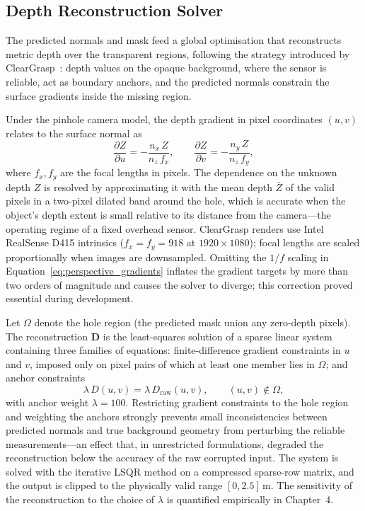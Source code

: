 \subsection{Depth Reconstruction Solver}
\label{subsec:solver}

The predicted normals and mask feed a global optimisation that reconstructs metric depth over the transparent regions, following the strategy introduced by ClearGrasp~\citep{sajjan2020}: depth values on the opaque background, where the sensor is reliable, act as boundary anchors, and the predicted normals constrain the surface gradients inside the missing region.

Under the pinhole camera model, the depth gradient in pixel coordinates $(u, v)$ relates to the surface normal as
\begin{equation}
    \frac{\partial Z}{\partial u} = -\frac{n_x\, Z}{n_z\, f_x}, \qquad
    \frac{\partial Z}{\partial v} = -\frac{n_y\, Z}{n_z\, f_y},
    \label{eq:perspective_gradients}
\end{equation}
where $f_x, f_y$ are the focal lengths in pixels. The dependence on the unknown depth $Z$ is resolved by approximating it with the mean depth $\bar{Z}$ of the valid pixels in a two-pixel dilated band around the hole, which is accurate when the object's depth extent is small relative to its distance from the camera---the operating regime of a fixed overhead sensor. ClearGrasp renders use Intel RealSense D415 intrinsics ($f_x = f_y = 918$ at $1920 \times 1080$); focal lengths are scaled proportionally when images are downsampled. Omitting the $1/f$ scaling in Equation~\ref{eq:perspective_gradients} inflates the gradient targets by more than two orders of magnitude and causes the solver to diverge; this correction proved essential during development.

Let $\Omega$ denote the hole region (the predicted mask union any zero-depth pixels). The reconstruction $\mathbf{D}$ is the least-squares solution of a sparse linear system containing three families of equations: finite-difference gradient constraints in $u$ and $v$, imposed only on pixel pairs of which at least one member lies in $\Omega$; and anchor constraints
\begin{equation}
    \lambda\, D(u, v) = \lambda\, D_{\mathrm{raw}}(u, v), \qquad (u, v) \notin \Omega,
\end{equation}
with anchor weight $\lambda = 100$. Restricting gradient constraints to the hole region and weighting the anchors strongly prevents small inconsistencies between predicted normals and true background geometry from perturbing the reliable measurements---an effect that, in unrestricted formulations, degraded the reconstruction below the accuracy of the raw corrupted input. The system is solved with the iterative LSQR method on a compressed sparse-row matrix, and the output is clipped to the physically valid range $[0, 2.5]$\,m. The sensitivity of the reconstruction to the choice of $\lambda$ is quantified empirically in Chapter~4.

